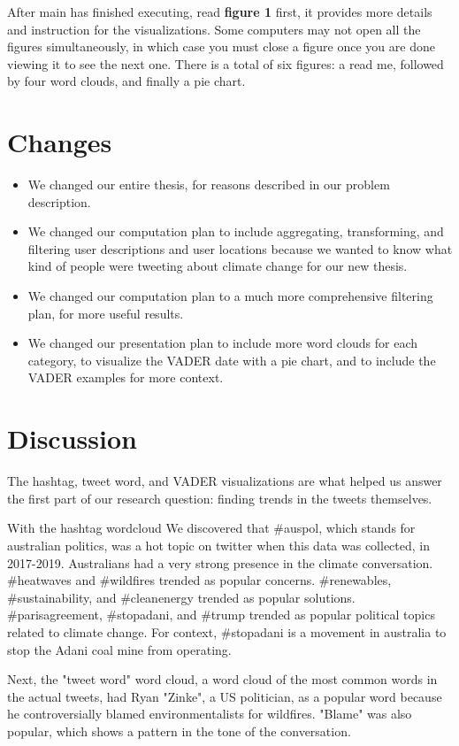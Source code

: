 \documentclass[fontsize=11pt]{article}
\begin{document}
After main has finished executing, read \textbf{figure 1} first, it provides more details and instruction for the visualizations. Some computers may not open all the figures simultaneously, in which case you must close a figure once you are done viewing it to see the next one. There is a total of six figures: a read me, followed by four word clouds, and finally a pie chart.

\section*{Changes}
\begin{itemize}
    \item We changed our entire thesis, for reasons described in our problem description.
    \item We changed our computation plan to include aggregating, transforming, and filtering user descriptions and user locations because we wanted to know what kind of people were tweeting about climate change for our new thesis.
    \item We changed our computation plan to a much more comprehensive filtering plan, for more useful results.
    \item We changed our presentation plan to include more word clouds for each category, to visualize the VADER date with a pie chart, and to include the VADER examples for more context.
\end{itemize}
\newpage

\section*{Discussion}
The hashtag, tweet word, and VADER visualizations are what helped us answer the first part of our research question: finding trends in the tweets themselves. 

With the hashtag wordcloud We discovered that \#auspol, which stands for australian politics, was a hot topic on twitter when this data was collected, in 2017-2019. Australians had a very strong presence in the climate conversation. \#heatwaves and \#wildfires trended as popular concerns. \#renewables, \#sustainability, and \#cleanenergy trended as popular solutions. \#parisagreement, \#stopadani, and \#trump trended as popular political topics related to climate change. For context, \#stopadani is a movement in australia to stop the Adani coal mine from operating.

Next, the "tweet word" word cloud, a word cloud of the most common words in the actual tweets, had Ryan "Zinke", a US politician, as a popular word because he controversially blamed environmentalists for wildfires. "Blame" was also popular, which shows a pattern in the tone of the conversation. 
\end{document}

